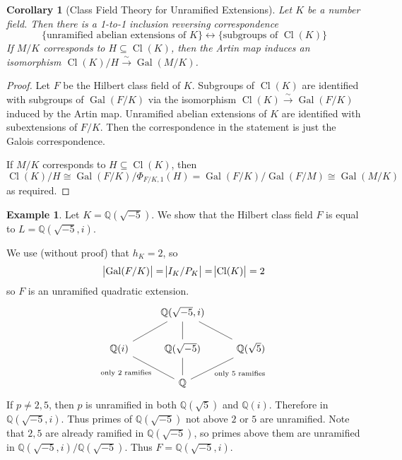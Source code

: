 \documentclass[11pt]{article}
\theoremstyle{definition}
\newtheorem{example}[definition]{Example}
\theoremstyle{plain}
\newtheorem{corollary}[definition]{Corollary}
\theoremstyle{remark}
\DeclareMathOperator{\Gal}{Gal}
\DeclareMathOperator{\Cl}{Cl}
\newcommand{\QQ}{\mathbb{Q}}
\begin{document}
\begin{corollary}[Class Field Theory for Unramified Extensions]\label{cor:4_6}
    Let $K$ be a number field. Then there is a 1-to-1 inclusion reversing correspondence
    \begin{equation*}
        \{\text{unramified abelian extensions of } K\} \longleftrightarrow \{\text{subgroups of } \Cl(K)\}
    \end{equation*}
    If $M/K$ corresponds to $H \subseteq \Cl(K)$, then the Artin map induces an isomorphism $\Cl(K)/H \xrightarrow{\sim} \Gal(M/K)$.
\end{corollary}
\begin{proof}\color{blue}
    Let $F$ be the Hilbert class field of $K$. Subgroups of $\Cl(K)$ are identified with subgroups of $\Gal(F/K)$ via the isomorphism $\Cl(K) \xrightarrow{\sim} \Gal(F/K)$ induced by the Artin map. Unramified abelian extensions of $K$ are identified with subextensions of $F/K$. Then the correspondence in the statement is just the Galois correspondence.

    If $M/K$ corresponds to $H \subseteq \Cl(K)$, then
    \begin{equation*}
        \Cl(K) / H \cong \Gal(F/K) / \Phi_{F/K,1}(H) = \Gal(F/K) / \Gal(F/M) \cong \Gal(M/K)
    \end{equation*}
    as required.
\end{proof}

\begin{example}\label{eg:4_7}
    Let $K = \QQ(\sqrt{-5})$. We show that the Hilbert class field $F$ is equal to $L = \QQ(\sqrt{-5}, i)$.

    We use (without proof) that $h_K = 2$, so
    \begin{equation*}
        \abs{\Gal(F/K)} = \abs{I_K/P_K} = \abs{\Cl(K)} = 2
    \end{equation*}
    so $F$ is an unramified quadratic extension.
    \begin{equation*}
    \begin{tikzcd}
        & \QQ(\sqrt{-5}, i) \arrow[dl, dash] \arrow[d, dash] \arrow[dr, dash] &\\
        \QQ(i) \arrow[dr, dash, "\text{only } 2 \text{ ramifies}"'] & \QQ(\sqrt{-5}) \arrow[d, dash] & \QQ(\sqrt{5}) \arrow[dl, dash, "\text{only } 5 \text{ ramifies}"]\\
        & \QQ
    \end{tikzcd}
    \end{equation*}
    If $p \neq 2, 5$, then $p$ is unramified in both $\QQ(\sqrt{5})$ and $\QQ(i)$. Therefore in $\QQ(\sqrt{-5}, i)$. Thus primes of $\QQ(\sqrt{-5})$ not above $2$ or $5$ are unramified. Note that $2, 5$ are already ramified in $\QQ(\sqrt{-5})$, so primes above them are unramified in $\QQ(\sqrt{-5}, i)/\QQ(\sqrt{-5})$. Thus $F = \QQ(\sqrt{-5}, i)$.
\end{example}
\end{document}
